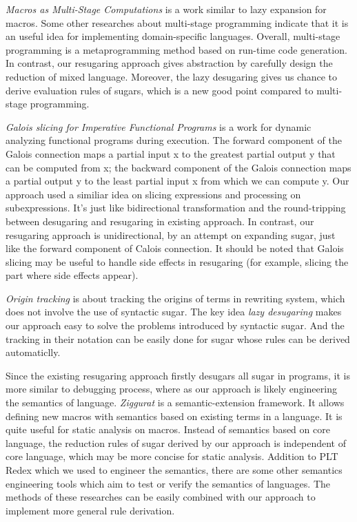 \emph{Macros as Multi-Stage Computations} \cite{multistage} is a work similar to lazy expansion for macros. Some other researches\cite{modularstaging} about multi-stage programming\cite{MSP} indicate that it is an useful idea for implementing domain-specific languages. Overall, multi-stage programming is a metaprogramming method based on run-time code generation. In contrast, our resugaring approach gives abstraction by carefully design the reduction of mixed language. Moreover, the lazy desugaring gives us chance to derive evaluation rules of sugars, which is a new good point compared to multi-stage programming.

\emph{Galois slicing for Imperative Functional Programs} \cite{slicing} is a work for dynamic analyzing functional programs during execution. The forward component of the Galois connection maps a partial input x to the greatest partial output y that can be computed from x; the backward component of the Galois connection maps a partial output y to the least partial input x from which we can compute y. Our approach used a similiar idea on slicing expressions and processing on subexpressions. It's just like bidirectional transformation \cite{bx} and the round-tripping between desugaring and resugaring in existing approach. In contrast, our resugaring approach is unidirectional, by an attempt on expanding sugar, just like the forward component of Calois connection. It should be noted that Galois slicing may be useful to handle side effects in resugaring (for example, slicing the part where side effects appear).

\emph{Origin tracking}\cite{origintracking} is about tracking the origins of terms in rewriting system, which does not involve the use of syntactic sugar. The key idea \emph{lazy desugaring} makes our approach easy to solve the problems introduced by syntactic sugar. And the tracking in their notation can be easily done for sugar whose rules can be derived automaticlly.

Since the existing resugaring approach firstly desugars all sugar in programs, it is more similar to debugging process, where as our approach is likely engineering the semantics of language. \emph{Ziggurat} \cite{Ziggurat} is a semantic-extension framework. It allows defining new macros with semantics based on existing terms in a language. It is quite useful for static analysis on macros. Instead of semantics based on core language, the reduction rules of sugar derived by our approach is independent of core language, which may be more concise for static analysis. Addition to PLT Redex\cite{SEwPR} which we used to engineer the semantics, there are some other semantics engineering tools \cite{dynsem,Ksemantic} which aim to test or verify the semantics of languages. The methods of these researches can be easily combined with our approach to implement more general rule derivation.

